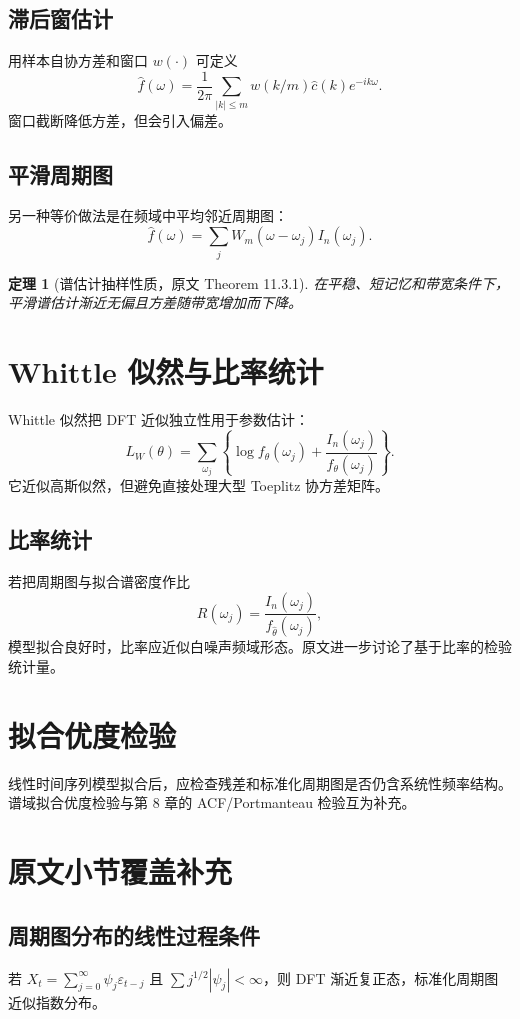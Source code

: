 \documentclass[11pt,a4paper]{ctexart}
\newtheorem{theorem}{定理}[section]
\begin{document}
\subsection{滞后窗估计}

用样本自协方差和窗口 \(w(\cdot)\) 可定义
\[
  \hat f(\omega)=\frac1{2\pi}\sum_{|k|\le m}w(k/m)\hat c(k)e^{-ik\omega}.
\]
窗口截断降低方差，但会引入偏差。

\subsection{平滑周期图}

另一种等价做法是在频域中平均邻近周期图：
\[
  \hat f(\omega)=\sum_j W_m(\omega-\omega_j)I_n(\omega_j).
\]
\begin{theorem}[谱估计抽样性质，原文 Theorem 11.3.1]
在平稳、短记忆和带宽条件下，平滑谱估计渐近无偏且方差随带宽增加而下降。
\end{theorem}

\section{Whittle 似然与比率统计}

Whittle 似然把 DFT 近似独立性用于参数估计：
\[
  L_W(\theta)=\sum_{\omega_j}
  \left\{\log f_\theta(\omega_j)+\frac{I_n(\omega_j)}{f_\theta(\omega_j)}\right\}.
\]
它近似高斯似然，但避免直接处理大型 Toeplitz 协方差矩阵。

\subsection{比率统计}

若把周期图与拟合谱密度作比
\[
  R(\omega_j)=\frac{I_n(\omega_j)}{f_{\hat\theta}(\omega_j)},
\]
模型拟合良好时，比率应近似白噪声频域形态。原文进一步讨论了基于比率的检验统计量。

\section{拟合优度检验}

线性时间序列模型拟合后，应检查残差和标准化周期图是否仍含系统性频率结构。谱域拟合优度检验与第 8 章的 ACF/Portmanteau 检验互为补充。

\section{原文小节覆盖补充}

\subsection{周期图分布的线性过程条件}
若 \(X_t=\sum_{j=0}^{\infty}\psi_j\varepsilon_{t-j}\) 且 \(\sum j^{1/2}|\psi_j|<\infty\)，则 DFT 渐近复正态，标准化周期图近似指数分布。
\end{document}
